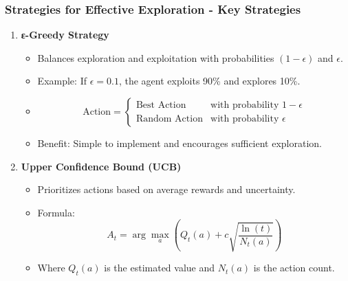 \documentclass[aspectratio=169]{beamer}
\begin{document}
\begin{frame}[fragile]
    \frametitle{Strategies for Effective Exploration - Key Strategies}
    \begin{enumerate}
        \item \textbf{ε-Greedy Strategy}
        \begin{itemize}
            \item Balances exploration and exploitation with probabilities \( (1 - \epsilon) \) and \( \epsilon \).
            \item Example: If \( \epsilon = 0.1 \), the agent exploits 90\% and explores 10\%.
            \item \begin{equation}
                \text{Action} = 
                \begin{cases} 
                    \text{Best Action} & \text{with probability } 1 - \epsilon \\ 
                    \text{Random Action} & \text{with probability } \epsilon 
                \end{cases}
            \end{equation}
            \item Benefit: Simple to implement and encourages sufficient exploration.
        \end{itemize}
        
        \item \textbf{Upper Confidence Bound (UCB)}
        \begin{itemize}
            \item Prioritizes actions based on average rewards and uncertainty.
            \item Formula:
            \begin{equation}
                A_t = \arg\max_{a} \left( Q_t(a) + c \sqrt{\frac{\ln(t)}{N_t(a)}} \right)
            \end{equation}
            \item Where \( Q_t(a) \) is the estimated value and \( N_t(a) \) is the action count.
        \end{itemize}
    \end{enumerate}
\end{frame}
\end{document}
